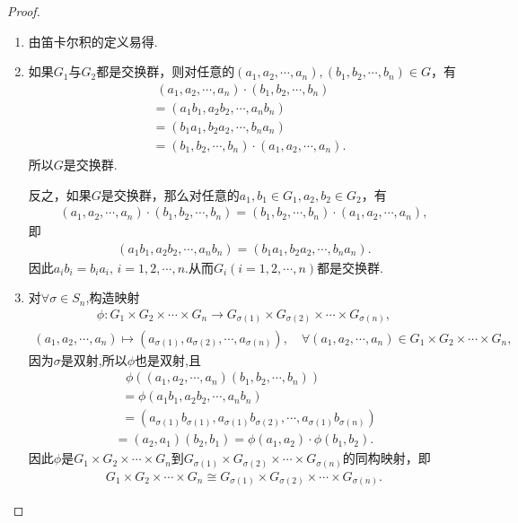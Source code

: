 \documentclass[../../main.tex]{subfiles}%
\begin{document}
\begin{proof}
\begin{enumerate}[(1)]
\item 由笛卡尔积的定义易得.

\item 如果$G_1$与$G_2$都是交换群，则对任意的$(a_1,a_2,\cdots ,a_n),(b_1,b_2,\cdots ,b_n)\in G$，有
\begin{align*}
&\,\,(a_1,a_2,\cdots ,a_n)\cdot (b_1,b_2,\cdots ,b_n)
\\
&=(a_1b_1,a_2b_2,\cdots ,a_nb_n)
\\
&=(b_1a_1,b_2a_2,\cdots ,b_na_n)
\\
&=(b_1,b_2,\cdots ,b_n)\cdot (a_1,a_2,\cdots ,a_n).
\end{align*}
所以$G$是交换群.

反之，如果$G$是交换群，那么对任意的$a_1,b_1 \in G_1, a_2,b_2 \in G_2$，有
\begin{align*}
(a_1,a_2,\cdots ,a_n)\cdot (b_1,b_2,\cdots ,b_n)=(b_1,b_2,\cdots ,b_n)\cdot (a_1,a_2,\cdots ,a_n),
\end{align*}
即
\begin{align*}
(a_1b_1,a_2b_2,\cdots ,a_nb_n)=(b_1a_1,b_2a_2,\cdots ,b_na_n).
\end{align*}
因此$a_ib_i=b_ia_i,\,i=1,2,\cdots,n.$从而$G_i(i=1,2,\cdots,n)$都是交换群.

\item 对$\forall \sigma \in S_n$,构造映射
\begin{align*}
\phi: G_1\times G_2\times \cdots \times G_n\longrightarrow G_{\sigma \left( 1 \right)}\times G_{\sigma \left( 2 \right)}\times \cdots \times G_{\sigma \left( n \right)},
\end{align*}
\begin{align*}
(a_1,a_2,\cdots ,a_n)\longmapsto (a_{\sigma \left( 1 \right)},a_{\sigma \left( 2 \right)},\cdots ,a_{\sigma \left( n \right)}),\quad \forall (a_1,a_2,\cdots ,a_n)\in G_1\times G_2\times \cdots \times G_n,
\end{align*}
因为$\sigma$是双射,所以$\phi$也是双射,且
\begin{align*}
&\,\,\phi ((a_1,a_2,\cdots ,a_n)(b_1,b_2,\cdots ,b_n))
\\
&=\phi (a_1b_1,a_2b_2,\cdots ,a_nb_n)
\\
&=(a_{\sigma \left( 1 \right)}b_{\sigma \left( 1 \right)},a_{\sigma \left( 1 \right)}b_{\sigma \left( 2 \right)},\cdots ,a_{\sigma \left( 1 \right)}b_{\sigma \left( n \right)})
\end{align*}
\begin{align*}
= (a_2,a_1)(b_2,b_1) = \phi(a_1,a_2) \cdot \phi(b_1,b_2).
\end{align*}
因此$\phi$是$G_1\times G_2\times \cdots \times G_n$到$G_{\sigma \left( 1 \right)}\times G_{\sigma \left( 2 \right)}\times \cdots \times G_{\sigma \left( n \right)}$的同构映射，即
\begin{align*}
G_1\times G_2\times \cdots \times G_n\cong G_{\sigma \left( 1 \right)}\times G_{\sigma \left( 2 \right)}\times \cdots \times G_{\sigma \left( n \right)}.
\end{align*}


\end{enumerate}
\end{proof}
\end{document}
